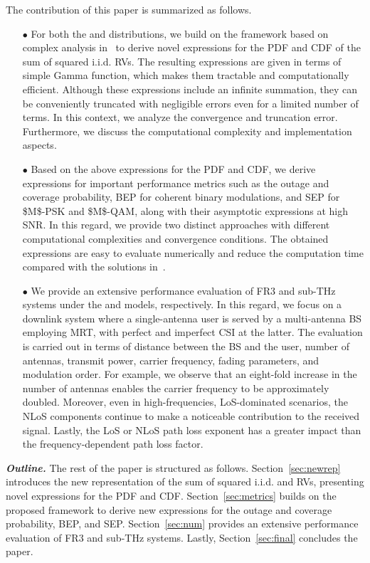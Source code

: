 \documentclass[journal,twocolumn]{IEEEtran}
\begin{document}
The contribution of this paper is summarized as follows.
\begin{itemize}
\item[$\bullet$] For both the \Ehm{} and \km{} distributions, we build on the framework based on complex analysis in~\cite{Alm23a} to derive novel expressions for the \ac{PDF} and \ac{CDF} of the sum of squared \ac{i.i.d.} \acp{RV}. The resulting expressions are given in terms of simple Gamma function, which makes them tractable and computationally efficient. Although these expressions include an infinite summation, they can be conveniently truncated with negligible errors even for a limited number of terms. In this context, we analyze the convergence and truncation error. Furthermore, we discuss the computational complexity and implementation aspects.
\item[$\bullet$] Based on the above expressions for the \ac{PDF} and \ac{CDF}, we derive expressions for important performance metrics such as the outage and coverage probability, \ac{BEP} for coherent binary modulations, and \ac{SEP} for \ac{$M$-PSK} and \ac{$M$-QAM}, along with their asymptotic expressions at high \ac{SNR}. In this regard, we provide two distinct approaches with different computational complexities and convergence conditions. The obtained expressions are easy to evaluate numerically and reduce the computation time compared with the solutions in~\cite{Bad21,Dix23}.
\item[$\bullet$] We provide an extensive performance evaluation of FR3 and sub-THz systems under the \Ehm{} and \km{} models, respectively. In this regard, we focus on a downlink system where a single-antenna user is served by a multi-antenna \ac{BS} employing \ac{MRT}, with perfect and imperfect \ac{CSI} at the latter. The evaluation is carried out in terms of distance between the \ac{BS} and the user, number of antennas, transmit power, carrier frequency, fading parameters, and modulation order. 
For example, we observe that an eight-fold increase in the number of antennas enables the carrier frequency to be approximately doubled. Moreover, even in high-frequencies, \ac{LoS}-dominated scenarios, the \ac{NLoS} components continue to make a noticeable contribution to the received signal. Lastly, the \ac{LoS} or \ac{NLoS} path loss exponent has a greater impact than the frequency-dependent path loss factor.

\end{itemize}

\smallskip

\textit{\textbf{Outline.}} The rest of the paper is structured as follows. Section~\ref{sec:newrep} introduces the new representation of the sum of squared \ac{i.i.d.}  \Ehm{} and \km{} \acp{RV}, presenting novel expressions for the \ac{PDF} and \ac{CDF}. Section~\ref{sec:metrics} builds on the proposed framework to derive new expressions for the outage and coverage probability, \ac{BEP}, and \ac{SEP}. Section~\ref{sec:num} provides an extensive performance evaluation of FR3 and sub-THz systems. Lastly, Section~\ref{sec:final} concludes the paper.
\end{document}
